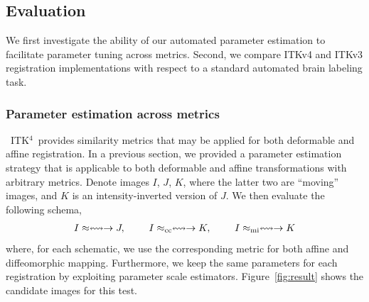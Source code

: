 \documentclass{frontiersSCNS}
\newcommand{\tk}{~ITK$^{\text{4}}$~}
\begin{document}
\subsection{Evaluation}
We first investigate the ability of our automated parameter estimation
to facilitate parameter tuning across metrics.  Second, we compare
ITKv4 and ITKv3 registration implementations with respect to a
standard automated brain labeling task.

\subsubsection{Parameter estimation across metrics}
\tk provides similarity metrics that may be applied for both
deformable and affine registration.  In a previous section, we
provided a parameter estimation strategy that is applicable to both
deformable and affine transformations with arbitrary metrics.  Denote
images $I$, $J$, $K$, where the latter two are ``moving'' images, and
$K$ is an intensity-inverted version of $J$.
We then evaluate the following schema,
\begin{eqnarray}
I \approx \leftrightsquigarrow  \rightarrow J,~~~~~~~
I \approx_\text{cc} \leftrightsquigarrow  \rightarrow  K,~~~~~~~  
I \approx_\text{mi} \leftrightsquigarrow  \rightarrow  K   \notag 
\end{eqnarray}
where, for each schematic, we use the corresponding metric for both
affine and diffeomorphic mapping.  Furthermore, we keep the same
parameters for each registration by exploiting parameter scale
estimators.  Figure~\ref{fig:result} shows the candidate images for
this test. 
\end{document}
